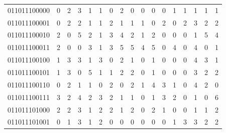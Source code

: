 \documentclass[10pt,a4paper]{article}
\begin{document}
\begin{longtable}{ |c|c|c|c|c|c|c|c|c|c|c|c|c|c|c|c|c| }
    011011100000              & 0                            & 2                                & 3                            & 1                              & 1   & 0   & 2   & 0   & 0   & 0   & 0   & 1   & 1   & 1   & 1   & 1   \\
    011011100001              & 0                            & 2                                & 2                            & 1                              & 1   & 2   & 1   & 1   & 1   & 0   & 2   & 0   & 2   & 3   & 2   & 2   \\
    011011100010              & 2                            & 0                                & 5                            & 2                              & 1   & 3   & 4   & 2   & 1   & 2   & 0   & 0   & 0   & 1   & 5   & 4   \\
    011011100011              & 2                            & 0                                & 0                            & 3                              & 1   & 3   & 5   & 5   & 4   & 5   & 0   & 4   & 0   & 4   & 0   & 1   \\
    011011100100              & 1                            & 3                                & 3                            & 1                              & 3   & 0   & 2   & 1   & 0   & 1   & 0   & 0   & 0   & 4   & 3   & 1   \\
    011011100101              & 1                            & 3                                & 0                            & 5                              & 1   & 1   & 2   & 2   & 0   & 1   & 0   & 0   & 0   & 3   & 2   & 2   \\
    011011100110              & 0                            & 2                                & 1                            & 1                              & 0   & 2   & 0   & 2   & 1   & 4   & 3   & 1   & 0   & 4   & 2   & 0   \\
    011011100111              & 3                            & 2                                & 4                            & 2                              & 3   & 2   & 1   & 1   & 0   & 1   & 3   & 2   & 0   & 1   & 0   & 6   \\
    011011101000              & 2                            & 2                                & 3                            & 1                              & 2   & 2   & 1   & 2   & 0   & 2   & 1   & 0   & 0   & 1   & 1   & 2   \\
    011011101001              & 0                            & 1                                & 3                            & 1                              & 2   & 0   & 0   & 0   & 0   & 0   & 0   & 1   & 3   & 3   & 2   & 2   \\

\end{longtable}
\end{document}
